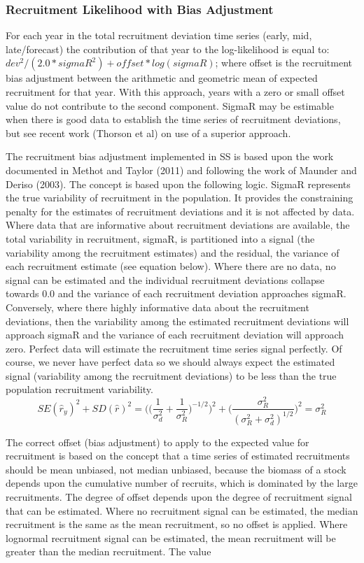 \subsubsection{Recruitment Likelihood with Bias Adjustment}
For each year in the total recruitment deviation time series (early, mid, late/forecast) the contribution of that year to the log-likelihood is equal to:  $dev^2/(2.0*sigmaR^2)+offset*log(sigmaR)$; where offset is the recruitment bias adjustment between the arithmetic and geometric mean of expected recruitment for that year.  With this approach, years with a zero or small offset value do not contribute to the second component. SigmaR may be estimable when there is good data to establish the time series of recruitment deviations, but see recent work (Thorson et al) on use of a superior approach.

The recruitment bias adjustment implemented in SS is based upon the work documented in Methot and Taylor (2011) and following the work of Maunder and Deriso (2003).  The concept is based upon the following logic.  SigmaR represents the true variability of recruitment in the population.  It provides the constraining penalty for the estimates of recruitment deviations and it is not affected by data.  Where data that are informative about recruitment deviations are available, the total variability in recruitment, sigmaR, is partitioned into a signal (the variability among the recruitment estimates) and the residual, the variance of each recruitment estimate (see equation below).  Where there are no data, no signal can be estimated and the individual recruitment deviations collapse towards 0.0 and the variance of each recruitment deviation approaches sigmaR.  Conversely, where there highly informative data about the recruitment deviations, then the variability among the estimated recruitment deviations will approach sigmaR and the variance of each recruitment deviation will approach zero.  Perfect data will estimate the recruitment time series signal perfectly.  Of course, we never have perfect data so we should always expect the estimated signal (variability among the recruitment deviations) to be less than the true population recruitment variability.
\begin{equation}
	SE(\hat{r}_y)^2 + SD(\hat{r})^2=\Bigg( \bigg( \frac{1}{\sigma^2_d}+\frac{1}{\sigma^2_R}\bigg)^{-1/2}\Bigg)^2+\Bigg( \frac{\sigma^2_R}{(\sigma^2_R+\sigma^2_d)^{1/2}}\Bigg)^2=\sigma^2_R
\end{equation}

The correct offset (bias adjustment) to apply to the expected value for recruitment is based on the concept that a time series of estimated recruitments should be mean unbiased, not median unbiased, because the biomass of a stock depends upon the cumulative number of recruits, which is dominated by the large recruitments.  The degree of offset depends upon the degree of recruitment signal that can be estimated.  Where no recruitment signal can be estimated, the median recruitment is the same as the mean recruitment, so no offset is applied.  Where lognormal recruitment signal can be estimated, the mean recruitment will be greater than the median recruitment.  The value

